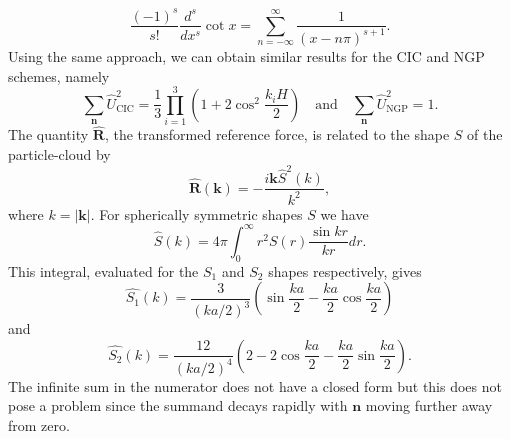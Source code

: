 \begin{equation*}
    \frac{(-1)^s}{s!}\frac{d^s}{dx^s}\cot x = \sum_{n=-\infty}^{\infty} \frac{1}{(x-n\pi)^{s+1}}.
\end{equation*}
Using the same approach, we can obtain similar results for the CIC and NGP schemes, namely
\begin{equation*}
    \sum_{\mathbf{n}}\hat{U}_\text{CIC}^2 = \frac{1}{3} \prod_{i=1}^{3} \left(1 + 2\cos^2\frac{k_i H}{2}\right)
    \quad \text{and} \quad
    \sum_{\mathbf{n}}\hat{U}_\text{NGP}^2 = 1.
\end{equation*}
The quantity $\hat{\mathbf{R}}$, the transformed reference force, is related to the shape $S$ of the particle-cloud by
\begin{equation*}
    \hat{\mathbf{R}}(\mathbf{k}) = -\frac{i\mathbf{k}\hat{S}^2(k)}{k^2},
\end{equation*}
where $k = |\mathbf{k}|$.
For spherically symmetric shapes $S$ we have
\begin{equation*}
    \hat{S}(k) = 4\pi \int_{0}^{\infty} r^2 S(r)\frac{\sin kr}{kr}dr.
\end{equation*}
This integral, evaluated for the $S_1$ and $S_2$ shapes respectively, gives
\begin{equation*}
    \hat{S_1}(k) = \frac{3}{(ka/2)^3} \left(\sin\frac{ka}{2} - \frac{ka}{2} \cos\frac{ka}{2}\right)
\end{equation*}
and
\begin{equation*}
    \hat{S_2}(k) = \frac{12}{(ka/2)^4}\left(2 - 2\cos\frac{ka}{2}-\frac{ka}{2}\sin\frac{ka}{2}\right).
\end{equation*}
The infinite sum in the numerator does not have a closed form but this does not pose a problem since the summand decays rapidly with $\mathbf{n}$ moving further away from zero.

